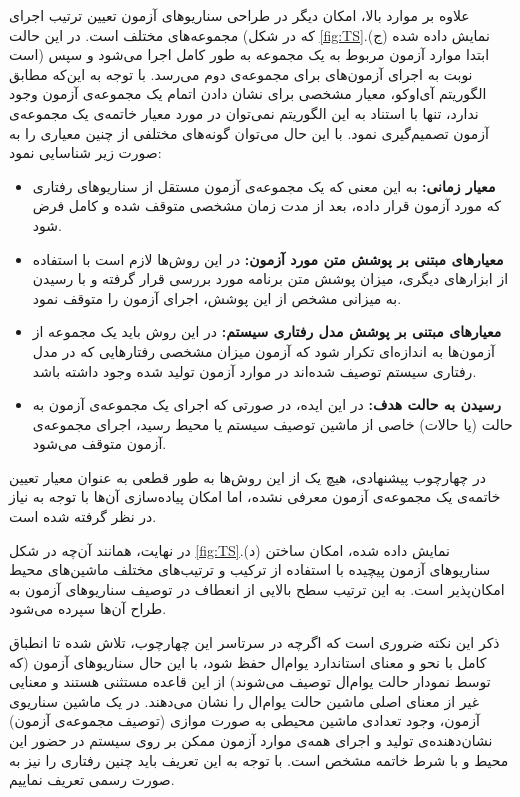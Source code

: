 علاوه بر موارد بالا، امکان دیگر در طراحی سناریوهای آزمون تعیین ترتیب اجرای مجموعه‌های مختلف است. در این حالت (که در شکل \ref{fig:TS}.(ج) نمایش داده شده است) ابتدا موارد آزمون‌ مربوط به یک مجموعه به طور کامل اجرا می‌شود و سپس نوبت به اجرای آزمون‌های برای مجموعه‌ی دوم می‌رسد. با توجه به این‌که مطابق الگوریتم آی‌اوکو، معیار مشخصی برای نشان دادن اتمام یک مجموعه‌ی آزمون وجود ندارد، تنها با استناد به این الگوریتم نمی‌توان در مورد معیار خاتمه‌ی یک مجموعه‌ی آزمون تصمیم‌گیری نمود. با این حال می‌توان گونه‌های مختلفی از چنین معیاری را به صورت زیر شناسایی نمود:
\begin{itemize}
\item \textbf{معیار زمانی: } به این معنی که یک مجموعه‌ی آزمون مستقل از سناریوهای رفتاری که مورد آزمون قرار داده، بعد از مدت زمان مشخصی متوقف شده و کامل فرض شود.
\item \textbf{معیارهای مبتنی بر \gls*{پوشش متن} مورد آزمون: } در این روش‌ها لازم است با استفاده از ابزارهای دیگری، میزان پوشش متن برنامه مورد بررسی قرار گرفته و با رسیدن به میزانی مشخص از این پوشش، اجرای آزمون را متوقف نمود.
\item \textbf{معیارهای مبتنی بر \gls*{پوشش مدل} رفتاری سیستم: } در این روش باید یک مجموعه از آزمون‌ها به اندازه‌ای تکرار شود که آزمون میزان مشخصی رفتارهایی که در مدل رفتاری سیستم توصیف شده‌اند در موارد آزمون تولید شده وجود داشته باشد.
\item \textbf{رسیدن به \gls*{حالت هدف}: } در این ایده، در صورتی که اجرای یک مجموعه‌ی آزمون به حالت (یا حالات) خاصی از ماشین توصیف سیستم یا محیط رسید، اجرای مجموعه‌ی آزمون متوقف می‌شود.
\end{itemize}
در چهارچوب پیشنهادی، هیچ یک از این روش‌ها به طور قطعی به عنوان معیار تعیین خاتمه‌ی یک مجموعه‌ی آزمون معرفی نشده، اما امکان پیاده‌سازی آن‌ها با توجه به نیاز در نظر گرفته شده است.

در نهایت، همانند آن‌چه در شکل \ref{fig:TS}.(د) نمایش داده شده، امکان ساختن سناریو‌های آزمون پیچیده با استفاده از ترکیب و ترتیب‌های مختلف ماشین‌های محیط امکان‌پذیر است. به این ترتیب سطح بالایی از انعطاف در توصیف سناریوهای آزمون به طراح آن‌ها سپرده می‌شود.

ذکر این نکته ضروری است که اگرچه در سرتاسر این چهارچوب، تلاش شده تا انطباق کامل با نحو و معنای استاندارد یوام‌ال حفظ شود، با این حال سناریوهای آزمون (که توسط نمودار حالت یوام‌ال توصیف می‌شوند) از این قاعده مستثنی هستند و معنایی غیر از معنای اصلی ماشین حالت یوام‌ال را نشان می‌دهند. در یک ماشین سناریوی آزمون، وجود تعدادی ماشین محیطی به صورت موازی (توصیف مجموعه‌ی آزمون) نشان‌دهنده‌ی تولید و اجرای همه‌ی موارد آزمون ممکن بر روی سیستم در حضور این محیط و با شرط خاتمه مشخص است. با توجه به این تعریف باید چنین رفتاری را نیز به صورت رسمی تعریف نماییم.

